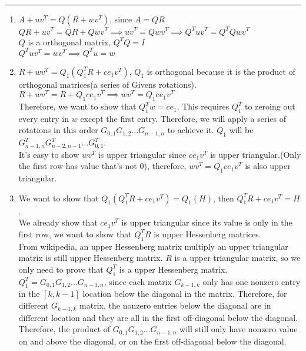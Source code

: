 \documentclass[11pt]{article}
\begin{document}





\begin{quote}

\end{quote}
\hrule


\begin{solution}
\item
    \begin{enumerate}
    \item  $A + uv^T = Q(R + wv^T) $, since $A = QR$\\
    $QR + uv^T = QR + Qwv^T \implies uv^T = Qwv^T \implies Q^Tuv^T = Q^TQwv^T$\\
    $Q$ is a orthogonal matrix, $Q^TQ = I$\\
    $Q^Tuv^T = wv^T \implies Q^Tu = w$
    \item $R + wv^T = Q_1(Q_1^TR + ce_1v^T)$, $Q_1$ is orthogonal because it is the product of orthogonal matrices(a series of Givens rotations).\\
    $R + wv^T = R + Q_1ce_1v^T \implies wv^T = Q_1ce_1v^T$\\
    Therefore, we want to show that $Q_1^Tw = ce_1$. This requires $Q_1^T$ to zeroing out every entry in $w$ except the first entry. Therefore, we will apply a series of rotations in this order $G_{0,1}G_{1,2}...G_{n-1,n}$ to achieve it. $Q_1$ will be $G_{n-1,n}^TG_{n-2,n-1}^T...G_{0,1}^T$. \\
    It's easy to show $wv^T$ is upper triangular since $ce_1v^T$ is upper triangular.(Only the first row has value that's not $0$), therefore, $wv^T = Q_1ce_1v^T$ is also upper triangular. 
    \item We want to show that $Q_1(Q_1^TR + ce_1v^T) = Q_1(H)$, then $Q_1^TR + ce_1v^T = H$.\\
    We already show that $ce_1v^T$ is upper triangular since its value is only in the first row, we want to show that $Q_1^TR$ is upper Hessenberg matrices.\\
    From wikipedia, an upper Hessenberg matrix multiply an upper triangular matrix is still upper Hessenberg matrix. $R$ is a upper triangular matrix, so we only need to prove that $Q_1^T$ is a upper Hessenberg matrix.\\
    $Q_1^T = G_{0,1}G_{1,2}...G_{n-1,n}$, since each matrix $G_{k-1,k}$ only has one nonzero entry in the $[k,k-1]$ location below the diagonal in the matrix. Therefore, for different $G_{k-1,k}$ matrix, the nonzero entries below the diagonal are in different location and they are all in the first off-diagonal below the diagonal. Therefore, the product of $ G_{0,1}G_{1,2}...G_{n-1,n}$ will still only have nonzero value on and above the diagonal, or on the first off-diagonal below the diagonal. \\

\end{enumerate}
\end{solution}
\end{document}
